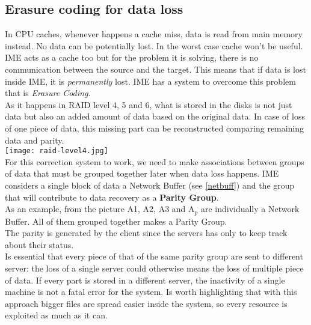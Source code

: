 \subsection{Erasure coding for data loss} \label{pargroup}
In CPU caches, whenever happens a cache miss, data is read from main memory
instead. No data can be potentially lost. In the worst case cache won't be
useful. \\
IME acts as a cache too but for the problem it is solving, there is no
communication between the source and the target. This means that if data
is lost inside IME, it is \textit{permanently} lost. IME has a system to overcome this
problem that is \textit{Erasure Coding}. \\
As it happens in RAID level 4, 5 and 6, what is stored in the disks is not just
data but also an added amount of data based on the original data. In case of
loss of one piece of data, this missing part can be reconstructed comparing
remaining data and parity. \\
\texttt{[image: raid-level4.jpg]} \\
For this correction system to work, we need to make associations between groups
of data that must be grouped together later when data loss happens. IME
considers a single block of data a Network Buffer (see \ref{netbuff}) and the
group that will contribute to data recovery as a \textbf{Parity Group}. \\
As an example, from the picture A1, A2, A3 and A$_p$ are individually a Network
Buffer. All of them grouped together makes a Parity Group. \\
The parity is generated by the client since the servers has only to keep track
about their status. \\
Is essential that every piece of that of the same parity group are sent to
different server: the loss of a single server could otherwise means the loss of
multiple piece of data. If every part is stored in a different server, the
inactivity of a single machine is not a fatal error for the system.
Is worth highlighting that with this approach bigger files are spread easier
inside the system, so every resource is exploited as much as it can.

\newpage

